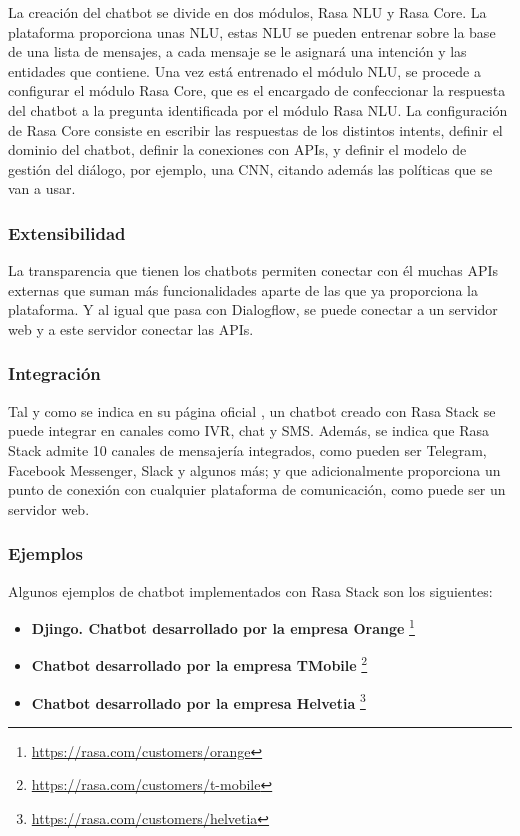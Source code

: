 La creación del chatbot se divide en dos módulos, Rasa NLU y Rasa Core. La plataforma proporciona unas \gls{NLU}, estas \gls{NLU} se pueden entrenar sobre la base de una lista de mensajes, a cada mensaje se le asignará una intención y las entidades que contiene. Una vez está entrenado el módulo \gls{NLU}, se procede a configurar el módulo Rasa Core, que es el encargado de confeccionar la respuesta del chatbot a la pregunta identificada por el módulo Rasa NLU. La configuración de Rasa Core consiste en escribir las respuestas de los distintos intents, definir el dominio del chatbot, definir la conexiones con \glspl{API}, y definir el modelo de gestión del diálogo, por ejemplo, una \gls{CNN}, citando además las políticas que se van a usar.

\subsubsection*{Extensibilidad}

La transparencia que tienen los chatbots permiten conectar con él muchas \glspl{API} externas que suman más funcionalidades aparte de las que ya proporciona la plataforma. Y al igual que pasa con Dialogflow, se puede conectar a un servidor web y a este servidor conectar las \glspl{API}.

\subsubsection*{Integración}

Tal y como se indica en su página oficial \cite{RefWorks:RefID:20-2020rasa}, un chatbot creado con Rasa Stack se puede integrar en canales como IVR, chat y SMS. Además, se indica que Rasa Stack admite 10 canales de mensajería integrados, como pueden ser Telegram, Facebook Messenger, Slack y algunos más; y que adicionalmente proporciona un punto de conexión con cualquier plataforma de comunicación, como puede ser un servidor web.

\subsubsection*{Ejemplos}

Algunos ejemplos de chatbot implementados con Rasa Stack son los siguientes:

\begin{itemize}
\item \textbf{Djingo. Chatbot desarrollado por la empresa Orange} \footnote{\url{https://rasa.com/customers/orange}}
\item \textbf{Chatbot desarrollado por la empresa TMobile} \footnote{\url{https://rasa.com/customers/t-mobile}}
\item \textbf{Chatbot desarrollado por la empresa Helvetia} \footnote{\url{https://rasa.com/customers/helvetia}}
\end{itemize}


